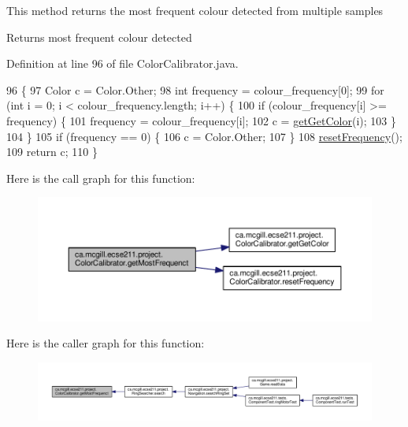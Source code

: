 This method returns the most frequent colour detected from multiple samples

\begin{DoxyReturn}{Returns}
most frequent colour detected 
\end{DoxyReturn}


Definition at line 96 of file Color\+Calibrator.\+java.


\begin{DoxyCode}
96                                          \{
97     Color c = Color.Other;
98     \textcolor{keywordtype}{int} frequency = colour\_frequency[0];
99     \textcolor{keywordflow}{for} (\textcolor{keywordtype}{int} i = 0; i < colour\_frequency.length; i++) \{
100       \textcolor{keywordflow}{if} (colour\_frequency[i] >= frequency) \{
101         frequency = colour\_frequency[i];
102         c = \hyperlink{classca_1_1mcgill_1_1ecse211_1_1project_1_1_color_calibrator_acb1d9cef0739971dbe00cc16712be0fe}{getGetColor}(i);
103       \}
104     \}
105     \textcolor{keywordflow}{if} (frequency == 0) \{
106       c = Color.Other;
107     \}
108     \hyperlink{classca_1_1mcgill_1_1ecse211_1_1project_1_1_color_calibrator_ab6148d75e3a105016580e90ed1ea9bc9}{resetFrequency}();
109     \textcolor{keywordflow}{return} c;
110   \}
\end{DoxyCode}
Here is the call graph for this function\+:\nopagebreak
\begin{figure}[H]
\begin{center}
\leavevmode
\includegraphics[width=350pt]{classca_1_1mcgill_1_1ecse211_1_1project_1_1_color_calibrator_a3d65927aaa2041f933dbdc19c3d2a412_cgraph}
\end{center}
\end{figure}
Here is the caller graph for this function\+:\nopagebreak
\begin{figure}[H]
\begin{center}
\leavevmode
\includegraphics[width=350pt]{classca_1_1mcgill_1_1ecse211_1_1project_1_1_color_calibrator_a3d65927aaa2041f933dbdc19c3d2a412_icgraph}
\end{center}
\end{figure}
